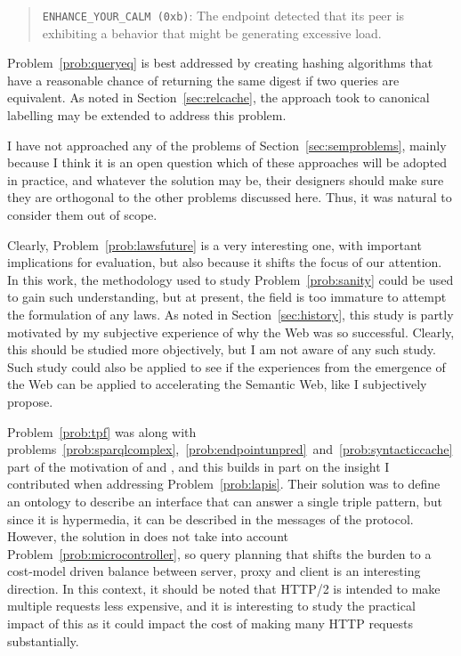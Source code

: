 \begin{quote}
\texttt{ENHANCE\_YOUR\_CALM (0xb)}:  The endpoint detected that its peer is
      exhibiting a behavior that might be generating excessive load.
\end{quote}


Problem~\ref{prob:queryeq} is best addressed by creating hashing
algorithms that have a reasonable chance of returning the same digest
if two queries are equivalent. As noted in Section~\ref{sec:relcache},
the approach \cite{papailiou2015graph} took to canonical labelling may
be extended to address this problem.

I have not approached any of the problems of
Section~\ref{sec:semproblems}, mainly because I think it is an open
question which of these approaches will be adopted in practice, and
whatever the solution may be, their designers should make sure they
are orthogonal to the other problems discussed here. Thus, it was
natural to consider them out of scope. 

Clearly, Problem~\ref{prob:lawsfuture} is a very interesting one, with
important implications for evaluation, but also because it shifts the
focus of our attention. In this work, the methodology used to study
Problem~\ref{prob:sanity} could be used to gain such understanding,
but at present, the field is too immature to attempt the formulation
of any laws. As noted in Section~\ref{sec:history}, this study is
partly motivated by my subjective experience of why the Web was so
successful. Clearly, this should be studied more objectively, but I am
not aware of any such study. Such study could also be applied to see
if the experiences from the emergence of the Web can be applied to
accelerating the Semantic Web, like I subjectively propose.

Problem~\ref{prob:tpf} was along with
problems~\ref{prob:sparqlcomplex},~\ref{prob:endpointunpred}~and~\ref{prob:syntacticcache}
part of the motivation of \cite{ldf1} and \cite{verborgh2014querying},
and this builds in part on the insight I contributed when addressing
Problem~\ref{prob:lapis}. Their solution was to define an ontology to
describe an interface that can answer a single triple pattern, but
since it is hypermedia, it can be described in the messages of the
protocol. However, the solution in \cite{verborgh2014querying} does
not take into account Problem~\ref{prob:microcontroller}, so query
planning that shifts the burden to a cost-model driven balance between
server, proxy and client is an interesting direction. In this context,
it should be noted that HTTP/2 \cite{rfc7540} is intended to make
multiple requests less expensive, and it is interesting to study the
practical impact of this as it could impact the cost of making many
HTTP requests substantially.

